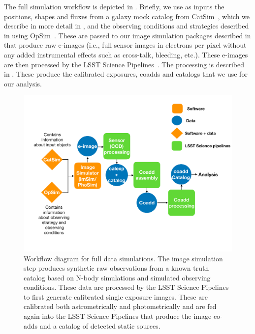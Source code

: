 \documentclass[\docopts]{\docclass}
\begin{document}
The full simulation workflow is depicted in . Briefly, we use as inputs the positions, shapes and fluxes from a galaxy mock catalog from CatSim~\citep{2010SPIE.7738E..1OC,2014SPIE.9150E..14C}, which we describe in more detail in , and the observing conditions and strategies described in  using OpSim~\citep{2014SPIE.9150E..15D}. These are passed to our image simulation packages described in  that produce raw e-images (i.e., full sensor images in electrons per pixel without any added instrumental effects such as cross-talk, bleeding, etc.). These e-images are then processed by the LSST Science Pipelines~\citep{2015arXiv151207914J, 2018PASJ...70S...5B}. The processing is described in . These produce the calibrated exposures, coadds and catalogs that we use for our analysis.

\begin{figure}
\centering
 \includegraphics[trim={0cm 1.5cm 0cm 1.05cm}, clip, width=1.0\columnwidth]{dc1_workflow}
\caption{Workflow diagram for full data simulations. The image simulation step produces synthetic raw observations from a known truth catalog based on N-body simulations and simulated observing conditions. These data are processed by the LSST Science Pipelines to first generate calibrated single exposure images. These are calibrated both astrometrically and photometrically and are fed again into the LSST Science Pipelines that produce the image co-adds and a catalog of detected static sources. 
}

\label{fig:dc1_workflow}
\end{figure}
\end{document}
